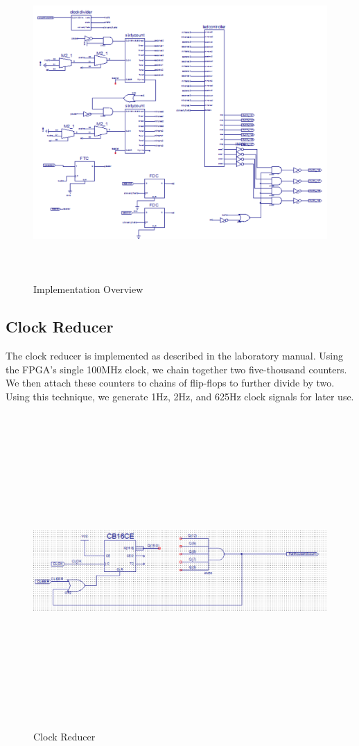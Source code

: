 \documentclass[paper=letter, fontsize=11pt]{scrartcl}
\begin{document}
\begin{figure}[H]
\includegraphics[height=120mm]{wholething.PNG}
\centering
\caption{Implementation Overview}
\label{overflow}
\end{figure}

\subsection{Clock Reducer}
The clock reducer is implemented as described in the laboratory manual. Using the FPGA's single 100MHz clock, we chain together two five-thousand counters. We then attach these counters to chains of flip-flops to further divide by two. Using this technique, we generate 1Hz, 2Hz, and 625Hz clock signals for later use.

\begin{figure}[H]
\includegraphics[height=120mm]{countfivethousand.PNG}
\centering
\caption{Clock Reducer}
\label{overflow}
\end{figure}
\end{document}
